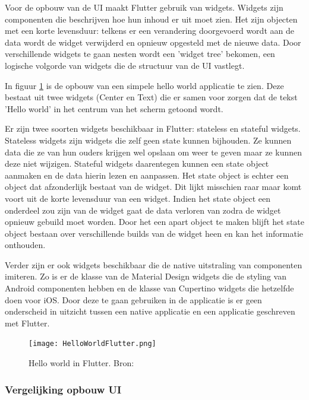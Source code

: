 Voor de opbouw van de UI maakt Flutter gebruik van widgets. Widgets zijn componenten die beschrijven hoe hun inhoud er uit moet zien. Het zijn objecten met een korte levensduur: telkens er een verandering doorgevoerd wordt aan de data wordt de widget verwijderd en opnieuw opgesteld met de nieuwe data. Door verschillende widgets te gaan nesten wordt een 'widget tree' bekomen, een logische volgorde van widgets die de structuur van de UI vastlegt. 

In figuur \ref{fig:helloWorldFlutter} is de opbouw van een simpele hello world applicatie te zien. Deze bestaat uit twee widgets (Center en Text) die er samen voor zorgen dat de tekst 'Hello world' in het centrum van het scherm getoond wordt. 

Er zijn twee soorten widgets beschikbaar in Flutter: stateless en stateful widgets. Stateless widgets zijn widgets die zelf geen state kunnen bijhouden. Ze kunnen data die ze van hun ouders krijgen wel opslaan om weer te geven maar ze kunnen deze niet wijzigen. Stateful widgets daarentegen kunnen een state object aanmaken en de data hierin lezen en aanpassen. Het state object is echter een object dat afzonderlijk bestaat van de widget. Dit lijkt misschien raar maar komt voort uit de korte levensduur van een widget. Indien het state object een onderdeel zou zijn van de widget gaat de data verloren van zodra de widget opnieuw gebuild moet worden. Door het een apart object te maken blijft het state object bestaan over verschillende builds van de widget heen en kan het informatie onthouden. 

Verder zijn er ook widgets beschikbaar die de native uitstraling van componenten imiteren. Zo is er de klasse van de Material Design widgets die de styling van Android componenten hebben en de klasse van Cupertino widgets die hetzelfde doen voor iOS. Door deze te gaan gebruiken in de applicatie is er geen onderscheid in uitzicht tussen een native applicatie en een applicatie geschreven met Flutter.


\begin{figure}
    \texttt{[image: HelloWorldFlutter.png]}
    \caption{Hello world in Flutter. Bron:
        \textcite{IntroductionToWidgets}}
    \label{fig:helloWorldFlutter}
\end{figure}

\subsubsection{Vergelijking opbouw UI}
\label{subsubsec:vglOpbouwUI}

